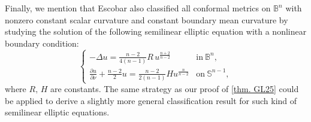 \documentclass[12pt]{amsart}
\numberwithin{equation}{section}
\numberwithin{lemma}{section}
\numberwithin{proposition}{section}
\numberwithin{corollary}{section}
\numberwithin{remark}{section}
\begin{document}
    Finally, we mention that Escobar \cite[Theorem 2.1]{Esc90} also classified all conformal metrics on $\mathbb{B}^n$ with nonzero constant scalar curvature and constant boundary mean curvature by studying the solution of the following semilinear elliptic equation with a nonlinear boundary condition:
    \begin{equation*}
            \begin{cases}
                -\Delta u=\frac{n-2}{4(n-1)}R\,u^{\frac{n+2}{n-2}} &\mathrm{ in} \ \mathbb{B}^n,\\
                \frac{\partial u}{\partial\nu}+\frac{n-2}{2} u=\frac{n-2}{2(n-1)}Hu^{\frac{n}{n-2}} &\mathrm{on}\ \mathbb{S}^{n-1},
            \end{cases}
        \end{equation*}
    where $R,\, H$ are constants. The same strategy as our proof of \cref{thm. GL25} could be applied to derive  a slightly more general classification result for such kind of semilinear elliptic equations.
\end{document}
